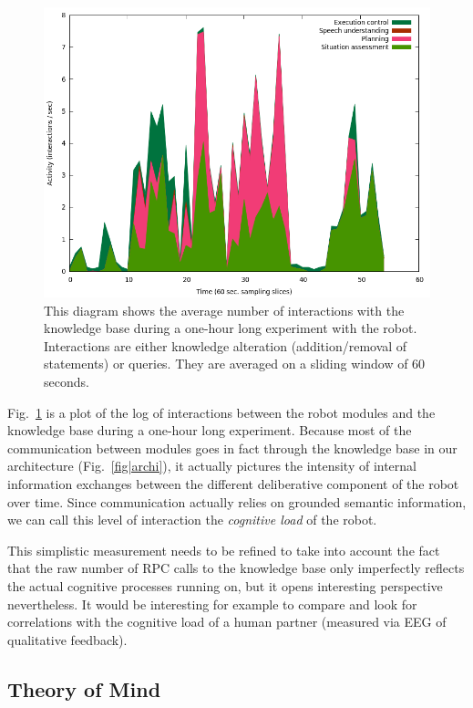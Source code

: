 \documentclass[letterpaper, 10 pt, conference]{ieeeconf}  %
\begin{document}
\begin{figure}
        \centering
        \includegraphics[width=\columnwidth]{figs/cognitive_load.png}
        \caption{This diagram shows the average number of interactions with the
        knowledge base during a one-hour long experiment with the robot.
        Interactions are either knowledge alteration (addition/removal of
        statements) or queries. They are averaged on a sliding window of 60 seconds.}
        \label{fig|cognitiveload}
\end{figure}

Fig.~\ref{fig|cognitiveload} is a plot of the log of interactions between the
robot modules and the knowledge base during a one-hour long experiment. Because
most of the communication between modules goes in fact through the knowledge
base in our architecture (Fig.~\ref{fig|archi}), it actually pictures the
intensity of internal information exchanges between the different deliberative
component of the robot over time. Since communication actually relies on
grounded semantic information, we can call this level of interaction the
\emph{cognitive load} of the robot.

This simplistic measurement needs to be refined to take into account the fact
that the raw number of RPC calls to the knowledge base only imperfectly
reflects the actual cognitive processes running on, but it opens interesting
perspective nevertheless. It would be interesting for example to compare
and look for correlations with the cognitive load of a human partner (measured
via EEG of qualitative feedback).

\subsection{Theory of Mind}
\label{sect|tom}
\end{document}
